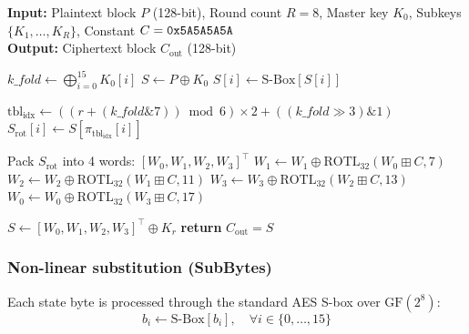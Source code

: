 \documentclass[10pt,twocolumn]{article}
\begin{document}
\begin{algorithm}[htbp]
\footnotesize
\caption{Tesseract-128 encryption pipeline.}
\label{alg:tesseract_enc}
\textbf{Input:} Plaintext block $P$ (128-bit), Round count $R=8$, Master key $K_0$, Subkeys $\{K_1, \dots, K_R\}$, Constant $C = \text{\texttt{0x5A5A5A5A}}$ \\
\textbf{Output:} Ciphertext block $C_{\text{out}}$ (128-bit)
\begin{algorithmic}[1]
\STATE {}
\STATE $\mathit{k\_fold} \leftarrow \bigoplus_{i=0}^{15} K_0[i]$
\STATE $S \leftarrow P \oplus K_0$
\STATE {}
    \STATE {}
        \STATE $S[i] \leftarrow \text{S-Box}[S[i]]$
    \ENDFOR
    
    \STATE {}
    \STATE $\text{tbl}_{\text{idx}} \leftarrow \left( (r + (\mathit{k\_fold} \mathbin{\&} 7)) \bmod 6 \right) \times 2 + ((\mathit{k\_fold} \gg 3) \mathbin{\&} 1)$
        \STATE $S_{\text{rot}}[i] \leftarrow S[\pi_{\text{tbl}_{\text{idx}}}[i]]$
    \ENDFOR
    
    \STATE {}
    \STATE Pack $S_{\text{rot}}$ into 4 words: $[W_0, W_1, W_2, W_3]^\top$
    \STATE $W_1 \leftarrow W_1 \oplus \text{ROTL}_{32}(W_0 \boxplus C, 7)$
    \STATE $W_2 \leftarrow W_2 \oplus \text{ROTL}_{32}(W_1 \boxplus C, 11)$
    \STATE $W_3 \leftarrow W_3 \oplus \text{ROTL}_{32}(W_2 \boxplus C, 13)$
    \STATE $W_0 \leftarrow W_0 \oplus \text{ROTL}_{32}(W_3 \boxplus C, 17)$
    
    \STATE {}
    \STATE $S \leftarrow [W_0, W_1, W_2, W_3]^\top \oplus K_r$
\ENDFOR
\STATE {}
\STATE \textbf{return} $C_{\text{out}} = S$
\end{algorithmic}
\end{algorithm}

\subsubsection{Non-linear substitution (SubBytes)}
Each state byte is processed through the standard AES S-box over $\text{GF}(2^8)$:
\begin{equation}
    b_i \leftarrow \text{S-Box}[b_i], \quad \forall i \in \{0, \dots, 15\}
\end{equation}
\end{document}
